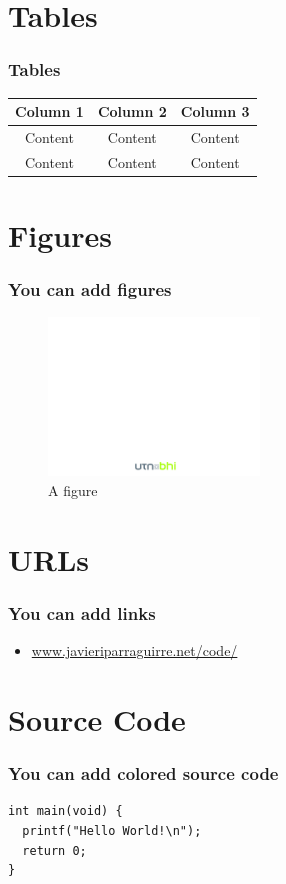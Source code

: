 \documentclass[]{beamer}
\begin{document}
\section{Tables}
\begin{frame}
  \frametitle{Tables}
\small{
\begin{table}
\centering
\begin{tabular}{ccc}
\hline
Column 1 & Column 2 & Column 3\\
\hline 
Content & Content & Content \\
Content & Content & Content \\ 
\hline
\end{tabular}
\end{table}
}
\end{frame} 

\section{Figures}
\begin{frame}
  \frametitle{You can add figures}
  \begin{figure}
    \includegraphics[width=0.5\textwidth]{theme/utn-bhi-page} 
    \caption{A figure}
  \end{figure}
\end{frame}

\section{URLs}
\begin{frame}
  \frametitle{You can add links}
  \begin{itemize}
    \item \small{\url{www.javieriparraguirre.net/code/}}
  \end{itemize}
\end{frame}

\section{Source Code}
\begin{frame}[fragile]
  \frametitle{You can add colored source code}
  \lstset{basicstyle=\small,style=myC++Style}  
  \begin{lstlisting}
int main(void) {
  printf("Hello World!\n");
  return 0;
}
  \end{lstlisting}
\end{frame}
\end{document}

